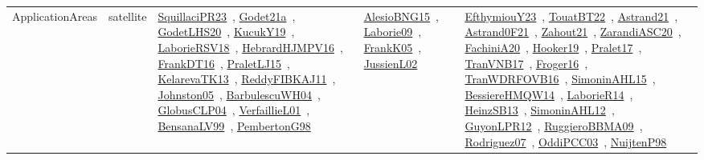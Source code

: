 {\begin{longtable}{lp{3cm}>{\raggedright\arraybackslash}p{6cm}>{\raggedright\arraybackslash}p{6cm}>{\raggedright\arraybackslash}p{8cm}}
ApplicationAreas & satellite & \href{../works/SquillaciPR23.pdf}{SquillaciPR23}~\cite{SquillaciPR23}, \href{../works/Godet21a.pdf}{Godet21a}~\cite{Godet21a}, \href{../works/GodetLHS20.pdf}{GodetLHS20}~\cite{GodetLHS20}, \href{../works/KucukY19.pdf}{KucukY19}~\cite{KucukY19}, \href{../works/LaborieRSV18.pdf}{LaborieRSV18}~\cite{LaborieRSV18}, \href{../works/HebrardHJMPV16.pdf}{HebrardHJMPV16}~\cite{HebrardHJMPV16}, \href{../works/FrankDT16.pdf}{FrankDT16}~\cite{FrankDT16}, \href{../works/PraletLJ15.pdf}{PraletLJ15}~\cite{PraletLJ15}, \href{../works/KelarevaTK13.pdf}{KelarevaTK13}~\cite{KelarevaTK13}, \href{../works/ReddyFIBKAJ11.pdf}{ReddyFIBKAJ11}~\cite{ReddyFIBKAJ11}, \href{../works/Johnston05.pdf}{Johnston05}~\cite{Johnston05}, \href{../works/BarbulescuWH04.pdf}{BarbulescuWH04}~\cite{BarbulescuWH04}, \href{../works/GlobusCLP04.pdf}{GlobusCLP04}~\cite{GlobusCLP04}, \href{../works/VerfaillieL01.pdf}{VerfaillieL01}~\cite{VerfaillieL01}, \href{../works/BensanaLV99.pdf}{BensanaLV99}~\cite{BensanaLV99}, \href{../works/PembertonG98.pdf}{PembertonG98}~\cite{PembertonG98} & \href{../works/AlesioBNG15.pdf}{AlesioBNG15}~\cite{AlesioBNG15}, \href{../works/Laborie09.pdf}{Laborie09}~\cite{Laborie09}, \href{../works/FrankK05.pdf}{FrankK05}~\cite{FrankK05}, \href{../works/JussienL02.pdf}{JussienL02}~\cite{JussienL02} & \href{../works/EfthymiouY23.pdf}{EfthymiouY23}~\cite{EfthymiouY23}, \href{../works/TouatBT22.pdf}{TouatBT22}~\cite{TouatBT22}, \href{../works/Astrand21.pdf}{Astrand21}~\cite{Astrand21}, \href{../works/Astrand0F21.pdf}{Astrand0F21}~\cite{Astrand0F21}, \href{../works/Zahout21.pdf}{Zahout21}~\cite{Zahout21}, \href{../works/ZarandiASC20.pdf}{ZarandiASC20}~\cite{ZarandiASC20}, \href{../works/FachiniA20.pdf}{FachiniA20}~\cite{FachiniA20}, \href{../works/Hooker19.pdf}{Hooker19}~\cite{Hooker19}, \href{../works/Pralet17.pdf}{Pralet17}~\cite{Pralet17}, \href{../works/TranVNB17.pdf}{TranVNB17}~\cite{TranVNB17}, \href{../works/Froger16.pdf}{Froger16}~\cite{Froger16}, \href{../works/TranWDRFOVB16.pdf}{TranWDRFOVB16}~\cite{TranWDRFOVB16}, \href{../works/SimoninAHL15.pdf}{SimoninAHL15}~\cite{SimoninAHL15}, \href{../works/BessiereHMQW14.pdf}{BessiereHMQW14}~\cite{BessiereHMQW14}, \href{../works/LaborieR14.pdf}{LaborieR14}~\cite{LaborieR14}, \href{../works/HeinzSB13.pdf}{HeinzSB13}~\cite{HeinzSB13}, \href{../works/SimoninAHL12.pdf}{SimoninAHL12}~\cite{SimoninAHL12}, \href{../works/GuyonLPR12.pdf}{GuyonLPR12}~\cite{GuyonLPR12}, \href{../works/RuggieroBBMA09.pdf}{RuggieroBBMA09}~\cite{RuggieroBBMA09}, \href{../works/Rodriguez07.pdf}{Rodriguez07}~\cite{Rodriguez07}, \href{../works/OddiPCC03.pdf}{OddiPCC03}~\cite{OddiPCC03}, \href{../works/NuijtenP98.pdf}{NuijtenP98}~\cite{NuijtenP98}\\

\end{longtable}}
